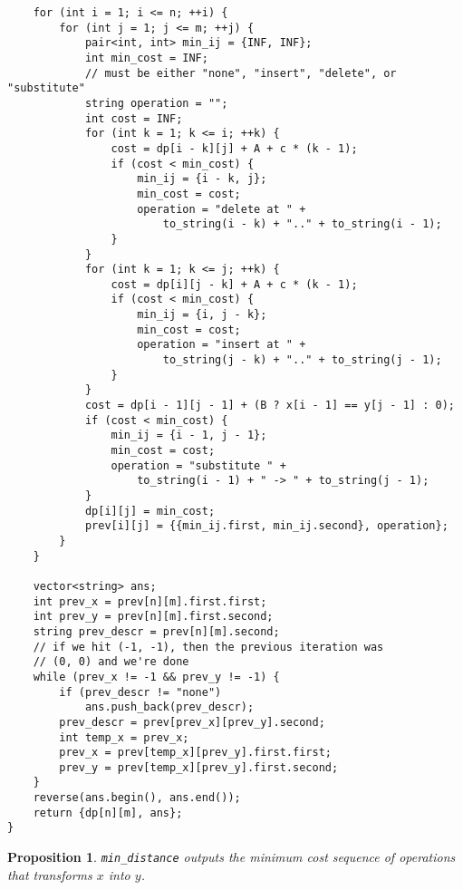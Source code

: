 \documentclass[10pt]{article}
\newtheorem{proposition}[lemma]{Proposition}
\begin{document}
\begin{lstlisting}
    for (int i = 1; i <= n; ++i) {
        for (int j = 1; j <= m; ++j) {
            pair<int, int> min_ij = {INF, INF};
            int min_cost = INF; 
            // must be either "none", "insert", "delete", or "substitute"
            string operation = "";
            int cost = INF;
            for (int k = 1; k <= i; ++k) {
                cost = dp[i - k][j] + A + c * (k - 1);
                if (cost < min_cost) {
                    min_ij = {i - k, j};
                    min_cost = cost;
                    operation = "delete at " + 
                        to_string(i - k) + ".." + to_string(i - 1);
                }
            }
            for (int k = 1; k <= j; ++k) {
                cost = dp[i][j - k] + A + c * (k - 1);
                if (cost < min_cost) {
                    min_ij = {i, j - k};
                    min_cost = cost;
                    operation = "insert at " + 
                        to_string(j - k) + ".." + to_string(j - 1);
                }
            }
            cost = dp[i - 1][j - 1] + (B ? x[i - 1] == y[j - 1] : 0);
            if (cost < min_cost) {
                min_ij = {i - 1, j - 1};
                min_cost = cost;
                operation = "substitute " + 
                    to_string(i - 1) + " -> " + to_string(j - 1);
            }
            dp[i][j] = min_cost;
            prev[i][j] = {{min_ij.first, min_ij.second}, operation};
        }
    }

    vector<string> ans;
    int prev_x = prev[n][m].first.first;
    int prev_y = prev[n][m].first.second;
    string prev_descr = prev[n][m].second;
    // if we hit (-1, -1), then the previous iteration was
    // (0, 0) and we're done
    while (prev_x != -1 && prev_y != -1) {
        if (prev_descr != "none")
            ans.push_back(prev_descr);
        prev_descr = prev[prev_x][prev_y].second;
        int temp_x = prev_x;
        prev_x = prev[temp_x][prev_y].first.first;
        prev_y = prev[temp_x][prev_y].first.second;
    }
    reverse(ans.begin(), ans.end());
    return {dp[n][m], ans};
}
\end{lstlisting}

\begin{proposition}
  \texttt{min\_distance} outputs the minimum cost sequence of operations that transforms \(x\) into \(y\).
\end{proposition}
\end{document}

